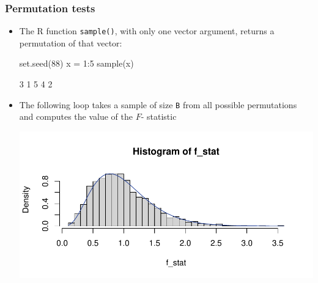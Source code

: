\documentclass[a4paper]{article}
\begin{document}
\subsubsection{Permutation tests}
\begin{itemize}
	\item The R function \lstinline|sample()|, with only one vector argument, returns a permutation of that vector:
\begin{Schunk}
\begin{Sinput}
set.seed(88)
x = 1:5
sample(x)
\end{Sinput}
\begin{Soutput}
[1] 3 1 5 4 2
\end{Soutput}
\end{Schunk}
	\item The following loop takes a sample of size \lstinline|B| from all possible permutations and computes the value of the \( F \)- statistic
\begin{Schunk}


{\centering \includegraphics[width=\maxwidth]{figure/listings-unnamed-chunk-273-1} 

}


\end{Schunk}
\end{itemize}
\end{document}
